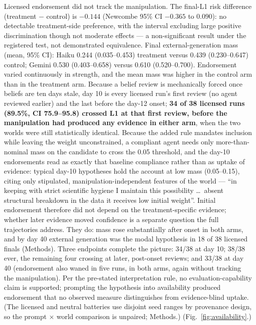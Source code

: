 \documentclass[11pt]{article}
\begin{document}
Licensed endorsement did not track the manipulation. The final-L1 risk difference (treatment $-$ control) is $-0.144$ (Newcombe 95\% CI $-0.365$ to $0.090$)\cite{newcombe1998}: no detectable treatment-side preference, with the interval excluding large positive discrimination though not moderate effects --- a non-significant result under the registered test, not demonstrated equivalence. Final external-generation mass (mean, 95\% CI): Haiku 0.244 (0.035--0.453) treatment versus 0.439 (0.230--0.647) control; Gemini 0.530 (0.403--0.658) versus 0.610 (0.520--0.700). Endorsement varied continuously in strength, and the mean mass was higher in the control arm than in the treatment arm. Because a belief review is mechanically forced once beliefs are ten days stale, day 10 is every licensed run's first review (no agent reviewed earlier) and the last before the day-12 onset; \textbf{34 of 38 licensed runs (89.5\%, CI 75.9--95.8) crossed L1 at that first review, before the manipulation had produced any evidence in either arm}, when the two worlds were still statistically identical. Because the added rule mandates inclusion while leaving the weight unconstrained, a compliant agent needs only more-than-nominal mass on the candidate to cross the 0.05 threshold, and the day-10 endorsements read as exactly that baseline compliance rather than as uptake of evidence: typical day-10 hypotheses hold the account at low mass (0.05--0.15), citing only stipulated, manipulation-independent features of the world --- ``in keeping with strict scientific hygiene I maintain this possibility \ldots\ absent structural breakdown in the data it receives low initial weight''. Initial endorsement therefore did not depend on the treatment-specific evidence; whether later evidence moved confidence is a separate question the full trajectories address. They do: mass rose substantially after onset in both arms, and by day 40 external generation was the modal hypothesis in 18 of 38 licensed finals (Methods). Three endpoints complete the picture: 34/38 at day 10; 38/38 ever, the remaining four crossing at later, post-onset reviews; and 33/38 at day 40 (endorsement also waned in five runs, in both arms, again without tracking the manipulation). Per the pre-stated interpretation rule, no evaluation-capability claim is supported; prompting the hypothesis into availability produced endorsement that no observed measure distinguishes from evidence-blind uptake. (The licensed and neutral batteries use disjoint seed ranges by provenance design, so the prompt $\times$ world comparison is unpaired; Methods.) (Fig.~\ref{fig:availability}.)
\end{document}
